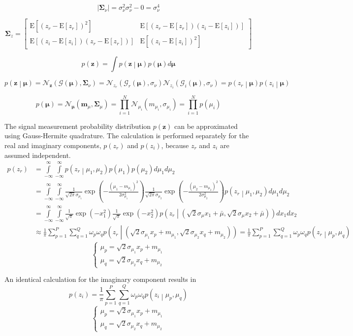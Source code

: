 \documentclass{article}         %
\theoremstyle{definition}
\theoremstyle{remark}
\newcommand{\eq}[1]{\begin{equation} #1 \end{equation}}
\newcommand{\al}[1]{\begin{align} #1 \end{align}}
\newcommand{\mbf}{\mathbf{m}}
\newcommand{\zbf}{\mathbf{z}}
\newcommand{\mubf}{\boldsymbol{\mu}}
\newcommand{\Sigmabf}{\boldsymbol{\Sigma}}
\newcommand{\Gscript}{\mathcal{G}}
\newcommand{\Nscript}{\mathcal{N}}
\newcommand{\paren}[1]{\left(#1\right)}
\newcommand{\arr}[2]{\begin{array}{#1} #2 \end{array}}
\newcommand{\expect}[1]{\mathrm{E}\left[#1\right]}
\newcommand{\intinfty}{\int\limits_{-\infty}^\infty}
\newcommand{\prodin}{\prod\limits_{i=1}^N}
\newcommand{\sumpp}{\sum\limits_{p=1}^P}
\newcommand{\sumqq}{\sum\limits_{q=1}^Q}
\newcommand{\normpdf}[3]{\frac{1}{\sqrt{2\pi}#3}\exp\paren{-\frac{\paren{#1-#2}^2}{2#3^2}}}
\begin{document}
\eq{\lvert\mathbf{\Sigma}_\nu\rvert = \sigma_\nu^2\sigma_\nu^2-0 = \sigma_\nu^4}

\eq{\mathbf{\Sigma}_z = \left[ \begin{array}{cc}
	\mathrm{E}\left[\left(z_r - \expect{z_r}\right)^2\right] & \mathrm{E}\left[\left(z_r - \expect{z_r}\right)\left(z_i - \expect{z_i}\right)\right] \\
	\mathrm{E}\left[\left(z_i - \expect{z_i}\right)\left(z_r - \expect{z_r}\right)\right] & \mathrm{E}\left[\left(z_i - \expect{z_i}\right)^2\right] \end{array} \right]}

\eq{p\paren{\zbf} = \int p\paren{\zbf\middle|\mubf}p\paren{\mubf}d\mubf}

\eq{p\paren{\zbf\middle|\mubf} = \Nscript_\zbf\paren{\mathbf{\Gscript}\paren{\mubf},\Sigmabf_\nu} = \Nscript_{z_r}\paren{\Gscript_r\paren{\mubf},\sigma_\nu}\Nscript_{z_i}\paren{\Gscript_i\paren{\mubf},\sigma_\nu} = p\paren{z_r\middle|\mubf}p\paren{z_i\middle|\mubf}}

\eq{p\paren{\mubf} = \Nscript_{\mubf}\paren{\mbf_\mu,\Sigmabf_\mu} = \prodin\Nscript_{\mu_i}\paren{m_{\mu_i},\sigma_{\mu_i}} = \prodin p\paren{\mu_i}}

The signal measurement probability distribution $p\paren{\zbf}$ can be approximated using Gauss-Hermite quadrature. The calculation is performed separately for the real and imaginary components, $p\paren{z_r}$ and $p\paren{z_i}$, because $z_r$ and $z_i$ are assumed independent.
\al{p\paren{z_r} &= \intinfty\intinfty p\paren{z_r\middle|\mu_1,\mu_2}p\paren{\mu_1}p\paren{\mu_2}d\mu_1d\mu_2 \\
&= \intinfty\intinfty\normpdf{\mu_1}{m_{\mu_1}}{\sigma_{\mu_1}}\normpdf{\mu_2}{m_{\mu_2}}{\sigma_{\mu_2}}p\paren{z_r\middle|\mu_1,\mu_2}d\mu_1d\mu_2 \\
&= \intinfty\intinfty\frac{1}{\sqrt{\pi}}\exp\paren{-x_1^2}\frac{1}{\sqrt{\pi}}\exp\paren{-x_2^2}p\paren{z_r\middle|\paren{\sqrt{2}\sigma_\mu x_1+\bar{\mu},\sqrt{2}\sigma_\mu x_2+\bar{\mu}}}dx_1dx_2 \\
&\approx \frac{1}{\pi}\sumpp\sumqq\omega_p\omega_qp\paren{z_r\middle|\paren{\sqrt{2}\sigma_{\mu_1}x_p+m_{\mu_1},\sqrt{2}\sigma_{\mu_2}x_q+m_{\mu_2}}} = \frac{1}{\pi}\sumpp\sumqq\omega_p\omega_qp\paren{z_r\middle|\mu_p,\mu_q}} 
\eq{\left\{\arr{l}{\mu_p = \sqrt{2}\sigma_{\mu_1}x_p+m_{\mu_1} \\ \mu_q = \sqrt{2}\sigma_{\mu_2}x_q+m_{\mu_2}}\right.}

An identical calculation for the imaginary component results in
\eq{p\paren{z_i} = \frac{1}{\pi}\sumpp\sumqq\omega_p\omega_qp\paren{z_i\middle|\mu_p,\mu_q}}
\eq{\left\{\arr{l}{\mu_p = \sqrt{2}\sigma_{\mu_1}x_p+m_{\mu_1} \\ \mu_q = \sqrt{2}\sigma_{\mu_2}x_q+m_{\mu_2}}\right.}
\end{document}
